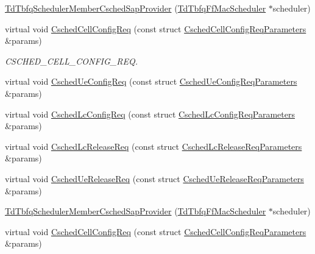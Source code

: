 \begin{DoxyCompactItemize}
\item 
\hyperlink{classns3_1_1TdTbfqSchedulerMemberCschedSapProvider_ae7f8eea502e4f622039fed03e3f4e647}{Td\+Tbfq\+Scheduler\+Member\+Csched\+Sap\+Provider} (\hyperlink{classns3_1_1TdTbfqFfMacScheduler}{Td\+Tbfq\+Ff\+Mac\+Scheduler} $\ast$scheduler)
\item 
virtual void \hyperlink{classns3_1_1TdTbfqSchedulerMemberCschedSapProvider_affda9f2a18a5eae0211df69d9ac205df}{Csched\+Cell\+Config\+Req} (const struct \hyperlink{structns3_1_1FfMacCschedSapProvider_1_1CschedCellConfigReqParameters}{Csched\+Cell\+Config\+Req\+Parameters} \&params)
\begin{DoxyCompactList}\small\item\em C\+S\+C\+H\+E\+D\+\_\+\+C\+E\+L\+L\+\_\+\+C\+O\+N\+F\+I\+G\+\_\+\+R\+EQ. \end{DoxyCompactList}\item 
virtual void \hyperlink{classns3_1_1TdTbfqSchedulerMemberCschedSapProvider_a34eff7722f739ad81f714bf432aaf218}{Csched\+Ue\+Config\+Req} (const struct \hyperlink{structns3_1_1FfMacCschedSapProvider_1_1CschedUeConfigReqParameters}{Csched\+Ue\+Config\+Req\+Parameters} \&params)
\item 
virtual void \hyperlink{classns3_1_1TdTbfqSchedulerMemberCschedSapProvider_a95d745f4bbe967a658d4d11ad81e2e38}{Csched\+Lc\+Config\+Req} (const struct \hyperlink{structns3_1_1FfMacCschedSapProvider_1_1CschedLcConfigReqParameters}{Csched\+Lc\+Config\+Req\+Parameters} \&params)
\item 
virtual void \hyperlink{classns3_1_1TdTbfqSchedulerMemberCschedSapProvider_afa003d35f1e2feae88fee74beb369395}{Csched\+Lc\+Release\+Req} (const struct \hyperlink{structns3_1_1FfMacCschedSapProvider_1_1CschedLcReleaseReqParameters}{Csched\+Lc\+Release\+Req\+Parameters} \&params)
\item 
virtual void \hyperlink{classns3_1_1TdTbfqSchedulerMemberCschedSapProvider_a16be3d0c6f3d657495c1131cc93efa8b}{Csched\+Ue\+Release\+Req} (const struct \hyperlink{structns3_1_1FfMacCschedSapProvider_1_1CschedUeReleaseReqParameters}{Csched\+Ue\+Release\+Req\+Parameters} \&params)
\item 
\hyperlink{classns3_1_1TdTbfqSchedulerMemberCschedSapProvider_ae7f8eea502e4f622039fed03e3f4e647}{Td\+Tbfq\+Scheduler\+Member\+Csched\+Sap\+Provider} (\hyperlink{classns3_1_1TdTbfqFfMacScheduler}{Td\+Tbfq\+Ff\+Mac\+Scheduler} $\ast$scheduler)
\item 
virtual void \hyperlink{classns3_1_1TdTbfqSchedulerMemberCschedSapProvider_aaed4a556ff1ec0f5b793bee4b0784ca5}{Csched\+Cell\+Config\+Req} (const struct \hyperlink{structns3_1_1FfMacCschedSapProvider_1_1CschedCellConfigReqParameters}{Csched\+Cell\+Config\+Req\+Parameters} \&params)

\end{DoxyCompactItemize}
